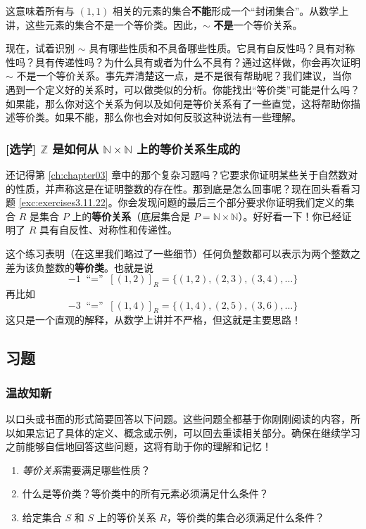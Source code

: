 \begin{example}
    这意味着所有与 $(1, 1)$ 相关的元素的集合\textbf{不能}形成一个``封闭集合''。从数学上讲，这些元素的集合不是一个等价类。因此，$\sim$ \textbf{不是}一个等价关系。

    现在，试着识别 $\sim$ 具有哪些性质和不具备哪些性质。它具有自反性吗？具有对称性吗？具有传递性吗？为什么具有或者为什么不具有？通过这样做，你会再次证明 $\sim$ 不是一个等价关系。事先弄清楚这一点，是不是很有帮助呢？我们建议，当你遇到一个定义好的关系时，可以做类似的分析。你能找出``等价类''可能是什么吗？如果能，那么你对这个关系为何以及如何是等价关系有了一些直觉，这将帮助你描述等价类。如果不能，那么你也会对如何反驳这种说法有一些理解。
\end{example}

\subsubsection*{[选学] $\mathbb{Z}$ 是如何从 $\mathbb{N} \times \mathbb{N}$ 上的等价关系生成的}

还记得第 \ref{ch:chapter03} 章中的那个复杂习题吗？它要求你证明某些关于自然数对的性质，并声称这是在证明整数的存在性。那到底是怎么回事呢？现在回头看看习题 \ref{exc:exercises3.11.22}。你会发现问题的最后三个部分要求你证明我们定义的集合 $R$ 是集合 $P$ 上的\textbf{等价关系}（底层集合是 $P = \mathbb{N} \times \mathbb{N}$）。好好看一下！你已经证明了 $R$ 具有自反性、对称性和传递性。

这个练习表明（在这里我们略过了一些细节）任何负整数都可以表示为两个整数之差为该负整数的\textbf{等价类}。也就是说
\[-1 \;\text{``$=$''}\; [(1, 2)]_R = \{(1, 2),(2, 3),(3, 4), \dots \}\]
再比如
\[-3 \;\text{``$=$''}\; [(1, 4)]_R = \{(1, 4),(2, 5),(3, 6), \dots \}\]
这只是一个直观的解释，从数学上讲并不严格，但这就是主要思路！

\subsection{习题}

\subsubsection*{温故知新}

以口头或书面的形式简要回答以下问题。这些问题全都基于你刚刚阅读的内容，所以如果忘记了具体的定义、概念或示例，可以回去重读相关部分。确保在继续学习之前能够自信地回答这些问题，这将有助于你的理解和记忆！

\begin{enumerate}[label=(\arabic*)]
    \item \emph{等价关系}需要满足哪些性质？
    \item 什么是等价类？等价类中的所有元素必须满足什么条件？
    \item 给定集合 $S$ 和 $S$ 上的等价关系 $R$，等价类的集合必须满足什么条件？
\end{enumerate}

